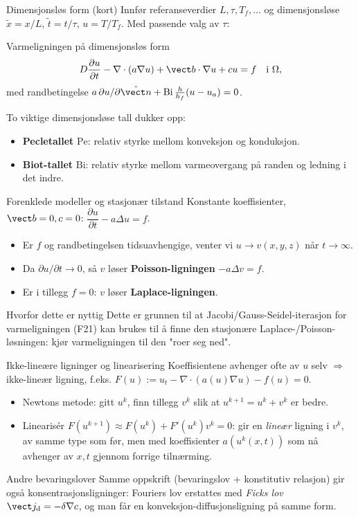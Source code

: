 \documentclass[11pt,aspectratio=169]{beamer}
\begin{document}
\begin{frame}{Dimensjonsløs form (kort)}
Innfør referanseverdier $L,\tau,T_f,\ldots$ og dimensjonsløse $\tilde x=x/L$, $\tilde t=t/\tau$, $u=T/T_f$. Med passende valg av $\tau$:
\begin{oppsumb}{Varmeligningen på dimensjonsløs form}
\[
D\frac{\partial u}{\partial t} - \nabla\cdot(a\nabla u) + \vect b\cdot\nabla u + cu = f \quad \text{i }\Omega,
\]
med randbetingelse $a\,\partial u/\partial\hat{\vect n} + \mathrm{Bi}\,\frac{h}{h_f}(u-u_a)=0$.
\end{oppsumb}
To viktige dimensjonsløse tall dukker opp:
\begin{itemize}
\item \textbf{Pecletallet} $\mathrm{Pe}$: relativ styrke mellom konveksjon og konduksjon.
\item \textbf{Biot-tallet} $\mathrm{Bi}$: relativ styrke mellom varmeovergang på randen og ledning i det indre.
\end{itemize}
\end{frame}

\begin{frame}{Forenklede modeller og stasjonær tilstand}
Konstante koeffisienter, $\vect b=0,c=0$: $\dfrac{\partial u}{\partial t}-a\Delta u=f$.
\begin{itemize}
\item Er $f$ og randbetingelsen tidsuavhengige, venter vi $u\to v(x,y,z)$ når $t\to\infty$.
\item Da $\partial u/\partial t\to0$, så $v$ løser \textbf{Poisson-ligningen} $-a\Delta v=f$.
\item Er i tillegg $f=0$: $v$ løser \textbf{Laplace-ligningen}.
\end{itemize}
\begin{remb}{Hvorfor dette er nyttig}
Dette er grunnen til at Jacobi/Gauss-Seidel-iterasjon for varmeligningen (F21) kan brukes til å finne den stasjonære Laplace-/Poisson-løsningen: kjør varmeligningen til den "roer seg ned".
\end{remb}
\end{frame}

\begin{frame}{Ikke-lineære ligninger og linearisering}
Koeffisientene avhenger ofte av $u$ selv $\Rightarrow$ ikke-lineær ligning, f.eks. $F(u):=u_t-\nabla\cdot(a(u)\nabla u)-f(u)=0$.
\begin{itemize}
\item Newtons metode: gitt $u^k$, finn tillegg $v^k$ slik at $u^{k+1}=u^k+v^k$ er bedre.
\item Linearisér $F(u^{k+1})\approx F(u^k)+F'(u^k)v^k=0$: gir en \emph{lineær} ligning i $v^k$, av samme type som før, men med koeffisienter $a(u^k(x,t))$ som nå avhenger av $x,t$ gjennom forrige tilnærming.
\end{itemize}
\begin{remb}{Andre bevaringslover}
Samme oppskrift (bevaringslov + konstitutiv relasjon) gir også konsentrasjonsligninger: Fouriers lov erstattes med \emph{Ficks lov} $\vect j_{\text d}=-\delta\nabla c$, og man får en konveksjon-diffusjonsligning på samme form.
\end{remb}
\end{frame}
\end{document}
